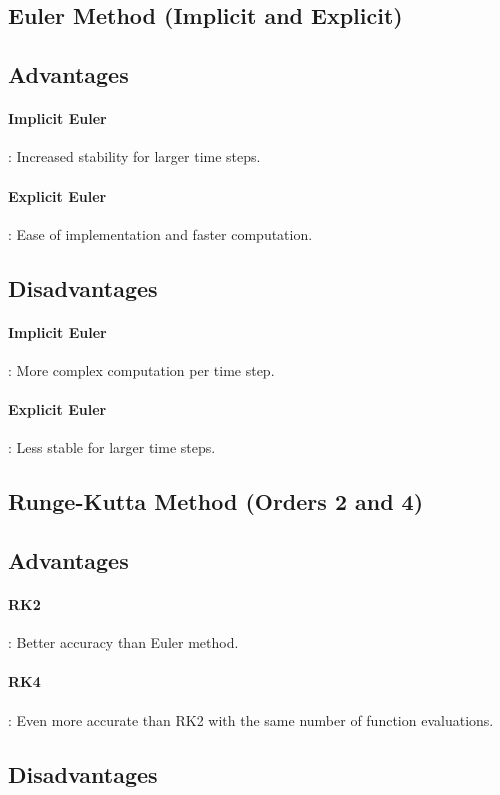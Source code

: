 \documentclass{article}
\begin{document}
\subsection{Euler Method (Implicit and Explicit)}
\subsection{Advantages}
 \paragraph{Implicit Euler}: Increased stability for larger time steps.
 
\paragraph{Explicit Euler}: Ease of implementation and faster computation.

\subsection{Disadvantages}
\paragraph{Implicit Euler}: More complex computation per time step.
\paragraph{Explicit Euler}: Less stable for larger time steps.

\subsection{Runge-Kutta Method (Orders 2 and 4)}
\subsection{Advantages}
\paragraph{RK2}: Better accuracy than Euler method.

\paragraph{RK4}: Even more accurate than RK2 with the same number of function evaluations.


\subsection{Disadvantages}
\end{document}
